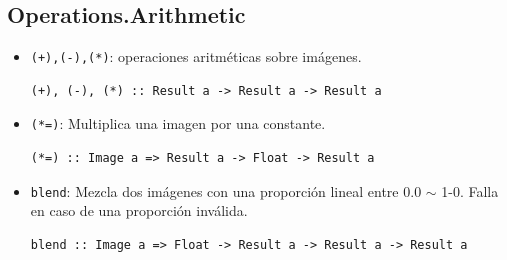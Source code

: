 \documentclass[a4paper, 11pt]{article} %
\begin{document}
\subsection*{Operations.Arithmetic}
	\begin{itemize} 
		\item \texttt{(+),(-),(*)}: operaciones aritméticas sobre imágenes.
\begin{lstlisting}
(+), (-), (*) :: Result a -> Result a -> Result a
\end{lstlisting}
		\item \texttt{(*=)}: Multiplica una imagen por una constante.
\begin{lstlisting}
(*=) :: Image a => Result a -> Float -> Result a
\end{lstlisting}
		\item \texttt{blend}: Mezcla dos imágenes con una proporción lineal entre 0.0 $\sim$ 1-0. Falla en caso de una proporción inválida.
\begin{lstlisting}
blend :: Image a => Float -> Result a -> Result a -> Result a
\end{lstlisting}

	\end{itemize}
\end{document}
